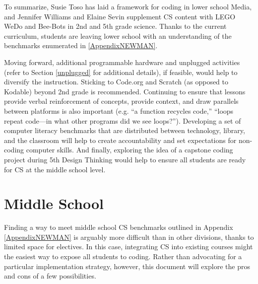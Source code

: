 To summarize, Susie Toso has laid a framework for coding in lower school Media, and Jennifer Williams and Elaine Sevin supplement CS content with LEGO WeDo and Bee-Bots in 2nd and 5th grade science. Thanks to the current curriculum, students are leaving lower school with an understanding of the benchmarks enumerated in \ref{AppendixNEWMAN}.\par 
Moving forward, additional programmable hardware and unplugged activities (refer to Section \ref{unplugged} for additional details), if feasible, would help to diversify the instruction. Sticking to Code.org and Scratch (as opposed to Kodable) beyond 2nd grade is recommended. Continuing to ensure that lessons provide verbal reinforcement of concepts, provide context, and draw parallels between platforms is also important (e.g. ``a function recycles code,'' ``loops repeat code---in what other programs did we see loops?''). Developing a set of computer literacy benchmarks that are distributed between technology, library, and the classroom will help to create accountability and set expectations for non-coding computer skills. And finally, exploring the idea of a capstone coding project during 5th Design Thinking would help to ensure all students are ready for CS at the middle school level.\par


\section{Middle School}
Finding a way to meet middle school CS benchmarks outlined in Appendix \ref{AppendixNEWMAN} is arguably more difficult than in other divisions, thanks to limited space for electives. In this case, integrating CS into existing courses might the easiest way to expose all students to coding. Rather than advocating for a particular implementation strategy, however, this document will explore the pros and cons of a few possibilities.\par

